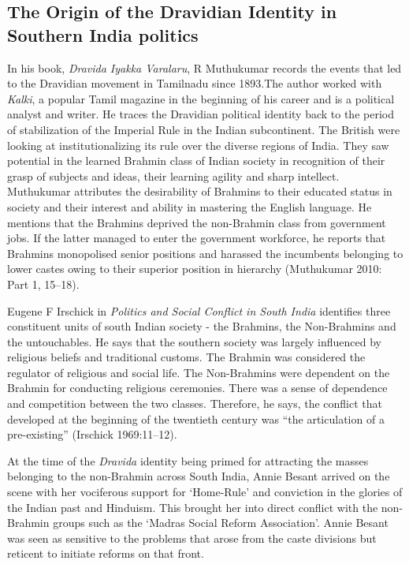 \subsection*{The Origin of the Dravidian Identity in Southern India politics}

\vskip -6pt

In his book, \textit{Dravida Iyakka Varalaru}, R Muthukumar records the events that led to the Dravidian movement in Tamilnadu since 1893.The author worked with \textit{Kalki}, a popular Tamil magazine in the beginning of his career and is a political analyst and writer. He traces the Dravidian political identity back to the period of stabilization of the Imperial Rule in the Indian subcontinent. The British were looking at institutionalizing its rule over the diverse regions of India. They saw potential in the learned Brahmin class of Indian society in recognition of their grasp of subjects and ideas, their learning agility and sharp intellect. Muthukumar attributes the desirability of Brahmins to their educated status in society and their interest and ability in mastering the English language. He mentions that the Brahmins deprived the non-Brahmin class from government jobs. If the latter managed to enter the government workforce, he reports that Brahmins monopolised senior positions and harassed the incumbents belonging to lower castes owing to their superior position in hierarchy (Muthukumar 2010: Part 1, 15–18).

Eugene F Irschick in \textit{Politics and Social Conflict in South India} identifies three constituent units of south Indian society - the Brahmins, the Non-Brahmins and the untouchables. He says that the southern society was largely influenced by religious beliefs and traditional customs. The Brahmin was considered the regulator of religious and social life. The Non-Brahmins were dependent on the Brahmin for conducting religious ceremonies. There was a sense of dependence and competition between the two classes. Therefore, he says, the conflict that developed at the beginning of the twentieth century was “the articulation of a pre-existing” (Irschick 1969:11–12).

At the time of the \textit{Dravida} identity being primed for attracting the masses belonging to the non-Brahmin across South India, Annie Besant arrived on the scene with her vociferous support for ‘Home-Rule’ and conviction in the glories of the Indian past and Hinduism. This brought her into direct conflict with the non-Brahmin groups such as the ‘Madras Social Reform Association’. Annie Besant was seen as sensitive to the problems that arose from the caste divisions but reticent to initiate reforms on that front.

